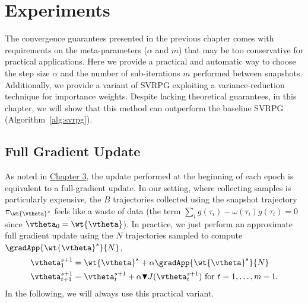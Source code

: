 \chapter{Experiments} \label{chap:experiments}
\vspace{-0.05in}
The convergence guarantees presented in the previous chapter comes with requirements on the meta-parameters (\ie $\alpha$ and $m$) that may be too conservative for practical applications.
Here we provide a practical and automatic way to choose the step size $\alpha$ and the number of sub-iterations $m$ performed between snapshots.
Additionally, we provide a variant of \acs{SVRPG} exploiting a variance-reduction technique for importance weights.
Despite lacking theoretical guarantees, in this chapter, we will show that this method can outperform the baseline \acs{SVRPG} (Algorithm~\ref{alg:svrpg}).

\vspace{-0.05in}
\section{Full Gradient Update}
\vspace{-0.05in}
As noted in \hyperref[chap:algorithm]{Chapter 3}, the update performed at the beginning of each epoch is equivalent to a full-gradient update. In our setting, where collecting samples is particularly expensive, the $B$ trajectories collected using the snapshot trajectory $\pi_{\wt{\vtheta}^s}$ feels like a waste of data (the term $\sum_i g(\tau_i) - \omega(\tau_i) g(\tau_i) =0$ since $\vtheta_0 = \wt{\vtheta}$).
In practice, we just perform an approximate full gradient update using the $N$ trajectories sampled to compute $\gradApp{\wt{\vtheta}^s}{N}$, \ie
\begin{align*}
&\vtheta_{1}^{s+1} = \wt{\vtheta}^s + \alpha\gradApp{\wt{\vtheta}^s}{N} \\
&\vtheta_{t+1}^{s+1} = \vtheta_t^{s+1} + \alpha 
\blacktriangledown J(\vtheta^{s+1}_t)
\text{ for $t=1,\dots,m-1$}.
\end{align*}
In the following, we will always use this practical variant.

\vspace{-0.05in}
